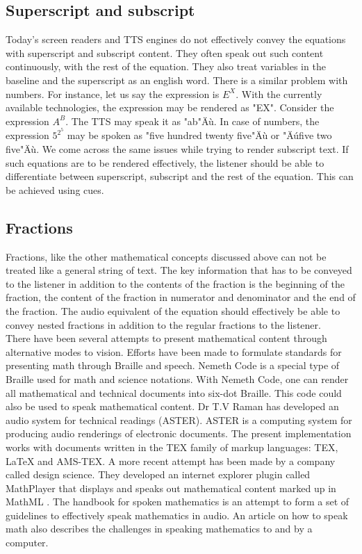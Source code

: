 \documentclass{article}
\begin{document}
\subsection{Superscript and subscript}
\label{ssec:supsub}
Today's screen readers and TTS engines do not effectively convey the equations with superscript and subscript content. They often speak out such content continuously, with the rest of the equation. They also treat variables in the baseline and the superscript as an english word. There is a similar problem with numbers. For instance, let us say the expression is $E^X$. With the currently available technologies, the expression may be rendered as "EX".  Consider the expression $A^B$. The TTS may speak it as "ab"Äù. In case of numbers, the expression $5^{2^5}$ may be spoken as "five hundred twenty five"Äù or "Äúfive two five"Äù. We come across the same issues while trying to render subscript text. If such equations are to be rendered effectively, the listener should be able to differentiate between superscript, subscript and the rest of the equation. This can be achieved using cues.

\subsection{Fractions}
\label{ssec:fractions}
Fractions, like the other mathematical concepts discussed above can not be treated like a general string of text. The key information that has to be conveyed to the listener in addition to the contents of the fraction is the beginning of the fraction, the content of the fraction in numerator and denominator and the end of the fraction. The audio equivalent of the equation should effectively be able to convey nested fractions in addition to the regular fractions to the listener. \\


There have been several attempts to present mathematical content through alternative modes to vision. Efforts have been made to formulate standards for presenting math through Braille and speech. Nemeth Code\cite{nemeth1973nemeth} is a special type of Braille used for math and science notations. With Nemeth Code, one can render all mathematical and technical documents into six-dot Braille. This code could also be used to speak mathematical content.
Dr T.V Raman has developed an audio system for technical readings (ASTER)\cite{raman1998audio}. ASTER is a computing system for producing audio renderings of electronic documents. The present implementation works with documents written in the TEX family of markup languages: TEX, LaTeX and AMS-TEX. A more recent attempt has been made by a company called design science. They developed an internet explorer plugin called MathPlayer \cite{soiffer2005mathplayer} that displays and speaks out mathematical content marked up in MathML \cite{ion1998mathematical}. The handbook for spoken mathematics \cite{chang1983handbook} is an attempt to form a set of guidelines to effectively speak mathematics in audio. An article on how to speak math \cite{fateman1998can} also describes the challenges in speaking mathematics to and by a computer.
\end{document}

